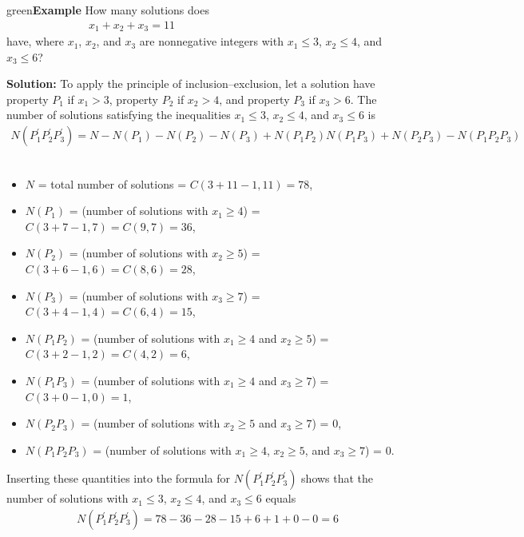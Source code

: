 \documentclass[11pt]{article}
\newenvironment{example}[1][\unskip]{\begin{mybox}{green}{\textbf{Example} {#1}}}{\end{mybox}}
\begin{document}
\begin{example}
How many solutions does
\begin{align*}
    x_1 + x_2 + x_3 = 11 &&&&&&&&&&&&&&&&&
\end{align*}
have, where $x_1$, $x_2$, and $x_3$ are nonnegative integers with $x_1 \leq 3$, $x_2 \leq 4$, and $x_3 \leq 6$?

\textbf{Solution:}
To apply the principle of inclusion–exclusion, let a solution have property $P_1$ if $x_1 > 3$, property $P_2$ if $x_2 > 4$, and property $P_3$ if $x_3 > 6$. The number of solutions satisfying the inequalities $x_1 \leq 3$, $x_2 \leq 4$, and $x_3 \leq 6$ is 
\begin{align*}
    N(P_1^{'}P_2^{'}P_3^{'}) = N - N(P_1) - N(P_2) - N(P_3) + N(P_1P_2) N(P_1P_3) + N(P_2P_3) - N(P_1P_2P_3)
\end{align*}
\\
\begin{itemize}
    \item $N$ = total number of solutions = $C(3 + 11 - 1, 11) = 78$,
    \item $N(P_1)$ = (number of solutions with $x_1 \geq 4$) = $C(3 + 7 - 1, 7) = C(9, 7) = 36$,
    \item $N(P_2)$ = (number of solutions with $x_2 \geq 5$) = $C(3 + 6 - 1, 6) = C(8, 6) = 28$,
    \item $N(P_3)$ = (number of solutions with $x_3 \geq 7$) = $C(3 + 4 - 1, 4) = C(6, 4) = 15$,
    \item $N(P_1P_2)$ = (number of solutions with $x_1 \geq 4$ and $x_2 \geq 5$) = $C(3 + 2 - 1, 2) = C(4, 2) = 6$,
    \item $N(P_1P_3)$ = (number of solutions with $x_1 \geq 4$ and $x_3 \geq 7$) = $C(3 + 0 - 1, 0) = 1$,
    \item $N(P_2P_3)$ = (number of solutions with $x_2 \geq 5$ and $x_3 \geq 7$) = $0$,
    \item $N(P_1P_2P_3)$ = (number of solutions with $x_1 \geq 4$, $x_2 \geq 5$, and $x_3 \geq 7$) = $0$.
\end{itemize}

Inserting these quantities into the formula for $N(P_1^{'}P^{'}_2P^{'}_3)$ shows that the number of solutions with $x_1 \leq 3$, $x_2 \leq 4$, and $x_3 \leq 6$ equals 
\begin{align*}
    N(P_1^{'}P^{'}_2P^{'}_3) = 78 - 36 - 28 - 15 + 6 + 1 + 0 - 0 = 6
\end{align*}
\end{example}
\end{document}
